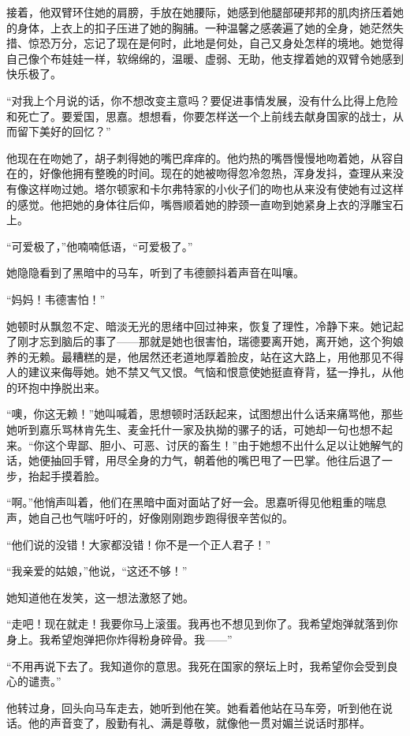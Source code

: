 \par 接着，他双臂环住她的肩膀，手放在她腰际，她感到他腿部硬邦邦的肌肉挤压着她的身体，上衣上的扣子压进了她的胸脯。一种温馨之感袭遍了她的全身，她茫然失措、惊恐万分，忘记了现在是何时，此地是何处，自己又身处怎样的境地。她觉得自己像个布娃娃一样，软绵绵的，温暖、虚弱、无助，他支撑着她的双臂令她感到快乐极了。
\par “对我上个月说的话，你不想改变主意吗？要促进事情发展，没有什么比得上危险和死亡了。要爱国，思嘉。想想看，你要怎样送一个上前线去献身国家的战士，从而留下美好的回忆？”
\par 他现在在吻她了，胡子刺得她的嘴巴痒痒的。他灼热的嘴唇慢慢地吻着她，从容自在的，好像他拥有整晚的时间。现在的她被吻得忽冷忽热，浑身发抖，查理从来没有像这样吻过她。塔尔顿家和卡尔弗特家的小伙子们的吻也从来没有使她有过这样的感觉。他把她的身体往后仰，嘴唇顺着她的脖颈一直吻到她紧身上衣的浮雕宝石上。
\par “可爱极了，”他喃喃低语，“可爱极了。”
\par 她隐隐看到了黑暗中的马车，听到了韦德颤抖着声音在叫嚷。
\par “妈妈！韦德害怕！”
\par 她顿时从飘忽不定、暗淡无光的思绪中回过神来，恢复了理性，冷静下来。她记起了刚才忘到脑后的事了——那就是她也很害怕，瑞德要离开她，离开她，这个狗娘养的无赖。最糟糕的是，他居然还老道地厚着脸皮，站在这大路上，用他那见不得人的建议来侮辱她。她不禁又气又恨。气恼和恨意使她挺直脊背，猛一挣扎，从他的环抱中挣脱出来。
\par “噢，你这无赖！”她叫喊着，思想顿时活跃起来，试图想出什么话来痛骂他，那些她听到嘉乐骂林肯先生、麦金托什一家及执拗的骡子的话，可她却一句也想不起来。“你这个卑鄙、胆小、可恶、讨厌的畜生！”由于她想不出什么足以让她解气的话，她便抽回手臂，用尽全身的力气，朝着他的嘴巴甩了一巴掌。他往后退了一步，抬起手摸着脸。
\par “啊。”他悄声叫着，他们在黑暗中面对面站了好一会。思嘉听得见他粗重的喘息声，她自己也气喘吁吁的，好像刚刚跑步跑得很辛苦似的。
\par “他们说的没错！大家都没错！你不是一个正人君子！”
\par “我亲爱的姑娘，”他说，“这还不够！”
\par 她知道他在发笑，这一想法激怒了她。
\par “走吧！现在就走！我要你马上滚蛋。我再也不想见到你了。我希望炮弹就落到你身上。我希望炮弹把你炸得粉身碎骨。我——”
\par “不用再说下去了。我知道你的意思。我死在国家的祭坛上时，我希望你会受到良心的谴责。”
\par 他转过身，回头向马车走去，她听到他在笑。她看着他站在马车旁，听到他在说话。他的声音变了，殷勤有礼、满是尊敬，就像他一贯对媚兰说话时那样。
